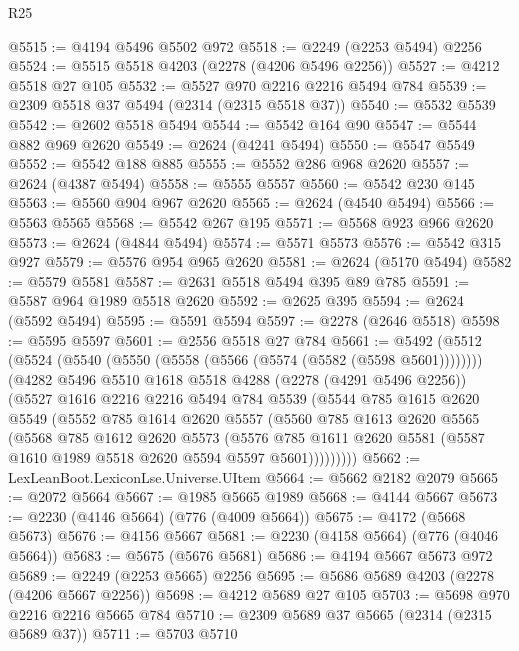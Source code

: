 \begin{lexlean}{R25}
\begin{coremodule}
@5515 := @4194 @5496 @5502 @972
@5518 := @2249 (@2253 @5494) @2256
@5524 := @5515 @5518 @4203 (@2278 (@4206 @5496 @2256))
@5527 := @4212 @5518 @27 @105
@5532 := @5527 @970 @2216 @2216 @5494 @784
@5539 := @2309 @5518 @37 @5494 (@2314 (@2315 @5518 @37))
@5540 := @5532 @5539
@5542 := @2602 @5518 @5494
@5544 := @5542 @164 @90
@5547 := @5544 @882 @969 @2620
@5549 := @2624 (@4241 @5494)
@5550 := @5547 @5549
@5552 := @5542 @188 @885
@5555 := @5552 @286 @968 @2620
@5557 := @2624 (@4387 @5494)
@5558 := @5555 @5557
@5560 := @5542 @230 @145
@5563 := @5560 @904 @967 @2620
@5565 := @2624 (@4540 @5494)
@5566 := @5563 @5565
@5568 := @5542 @267 @195
@5571 := @5568 @923 @966 @2620
@5573 := @2624 (@4844 @5494)
@5574 := @5571 @5573
@5576 := @5542 @315 @927
@5579 := @5576 @954 @965 @2620
@5581 := @2624 (@5170 @5494)
@5582 := @5579 @5581
@5587 := @2631 @5518 @5494 @395 @89 @785
@5591 := @5587 @964 @1989 @5518 @2620
@5592 := @2625 @395
@5594 := @2624 (@5592 @5494)
@5595 := @5591 @5594
@5597 := @2278 (@2646 @5518)
@5598 := @5595 @5597
@5601 := @2556 @5518 @27 @784
@5661 := @5492
    (@5512
      (@5524 (@5540 (@5550 (@5558 (@5566 (@5574 (@5582 (@5598 @5601))))))))
      (@4282
        @5496
        @5510
        @1618
        @5518
        @4288
        (@2278 (@4291 @5496 @2256))
        (@5527
          @1616
          @2216
          @2216
          @5494
          @784
          @5539
          (@5544
            @785
            @1615
            @2620
            @5549
            (@5552
              @785
              @1614
              @2620
              @5557
              (@5560
                @785
                @1613
                @2620
                @5565
                (@5568
                  @785
                  @1612
                  @2620
                  @5573
                  (@5576
                    @785
                    @1611
                    @2620
                    @5581
                    (@5587 @1610 @1989 @5518 @2620 @5594 @5597 @5601)))))))))
@5662 := LexLeanBoot.LexiconLse.Universe.UItem
@5664 := @5662 @2182 @2079
@5665 := @2072 @5664
@5667 := @1985 @5665 @1989
@5668 := @4144 @5667
@5673 := @2230 (@4146 @5664) (@776 (@4009 @5664))
@5675 := @4172 (@5668 @5673)
@5676 := @4156 @5667
@5681 := @2230 (@4158 @5664) (@776 (@4046 @5664))
@5683 := @5675 (@5676 @5681)
@5686 := @4194 @5667 @5673 @972
@5689 := @2249 (@2253 @5665) @2256
@5695 := @5686 @5689 @4203 (@2278 (@4206 @5667 @2256))
@5698 := @4212 @5689 @27 @105
@5703 := @5698 @970 @2216 @2216 @5665 @784
@5710 := @2309 @5689 @37 @5665 (@2314 (@2315 @5689 @37))
@5711 := @5703 @5710

\end{coremodule}
\end{lexlean}
